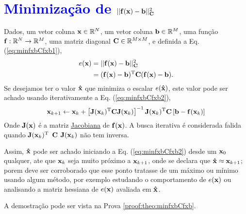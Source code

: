 \section{\textcolor{blue}{Minimização de $||\VECTOR{f}(\VECTOR{x})-\VECTOR{b}||_{\MATRIX{C}}^2$}
}

\begin{theorem}\label{theo:minfxbCfxb}
Dados,
um vetor coluna $\VECTOR{x}\in \mathbb{R}^N$, 
um vetor coluna $\VECTOR{b}\in \mathbb{R}^M$,  
uma função $\VECTOR{f}:\mathbb{R}^{N} \rightarrow \mathbb{R}^{M}$, 
uma matriz diagonal $\MATRIX{C} \in \mathbb{R}^{M\times M}$, e 
definida a Eq. (\ref{eq:minfxbCfxb1}),
\begin{align}\label{eq:minfxbCfxb1}
e(\VECTOR{x}) & = ||\VECTOR{f}(\VECTOR{x})-\VECTOR{b}||_{\MATRIX{C}}^2 \\
              & = (\VECTOR{f}(\VECTOR{x})-\VECTOR{b})^{\transpose}\MATRIX{C}(\VECTOR{f}(\VECTOR{x})-\VECTOR{b}).
\end{align}
Se desejamos ter o valor $\VECTOR{\hat{x}}$ que minimiza o escalar $e(\VECTOR{\hat{x}})$,
este valor pode ser achado usando iterativamente a Eq. (\ref{eq:minfxbCfxb2}),
\begin{equation}\label{eq:minfxbCfxb2}
\VECTOR{x}_{k+1} \leftarrow \VECTOR{x}_k+
\left[ \MATRIX{J}(\VECTOR{x}_k)^{\transpose}\MATRIX{C} \MATRIX{J}(\VECTOR{x}_k) \right]^{-1}
 \MATRIX{J}(\VECTOR{x}_k)^{\transpose}\MATRIX{C}\left[\VECTOR{b}-\VECTOR{f}(\VECTOR{x}_k)\right]
\end{equation}
Onde  $\MATRIX{J}(\VECTOR{x})$ é a matriz \hyperref[def:jacobian]{Jacobiana} \cite{Jacobian} de $\VECTOR{f}(\VECTOR{x})$.
A busca iterativa é considerada falida quando 
$\MATRIX{J}(\VECTOR{x}_k)^{\transpose}$ $\MATRIX{C}$ $\MATRIX{J}(\VECTOR{x}_k)$
não tem inversa.

Assim, $\VECTOR{\hat{x}}$ pode ser achado iniciando a Eq. (\ref{eq:minfxbCfxb2}) desde um $\VECTOR{x}_{0}$ qualquer, ate que $\VECTOR{x}_{k}$ seja muito próximo a $\VECTOR{x}_{k+1}$,
onde se declara que $\VECTOR{\hat{x}} \approx \VECTOR{x}_{k+1}$; porem deve ser corroborado
que esse ponto tratasse de um máximo ou mínimo usando algum método, por exemplo estudando o comportamento 
de $e(\VECTOR{x})$ ou analisando a matriz hessiana de $e(\VECTOR{x})$ avaliada em $\VECTOR{\hat{x}}$.

A demostração pode ser vista na Prova \ref{proof:theo:minfxbCfxb}.
\end{theorem}

